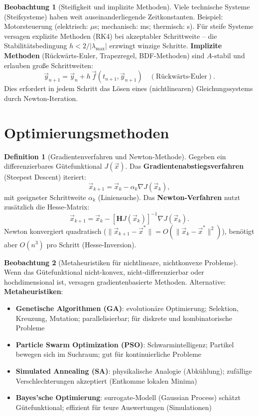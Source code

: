 ﻿\documentclass[a4paper,12pt]{report}
\theoremstyle{definition}
\newtheorem{definition}{Definition}
\newtheorem{beobachtung}{Beobachtung}
\begin{document}
\begin{beobachtung}[Steifigkeit und implizite Methoden]
Viele technische Systeme (Steifsysteme) haben weit auseinanderliegende
Zeitkonstanten. Beispiel: Motorsteuerung (elektrisch: $\mu$s; mechanisch: ms; thermisch: s).
Für steife Systeme versagen explizite Methoden (RK4) bei akzeptabler Schrittweite --
die Stabilitätsbedingung $h < 2/|\lambda_{\max}|$ erzwingt winzige Schritte.
\textbf{Implizite Methoden} (Rückwärts-Euler, Trapezregel, BDF-Methoden)
sind $A$-stabil und erlauben große Schrittweiten:
\[
  \vec{y}_{n+1} = \vec{y}_n + h\,\vec{f}(t_{n+1}, \vec{y}_{n+1}) \quad (\text{Rückwärts-Euler}).
\]
Dies erfordert in jedem Schritt das Lösen eines (nichtlinearen) Gleichungssystems
durch Newton-Iteration.
\end{beobachtung}

\section{Optimierungsmethoden}

\begin{definition}[Gradientenverfahren und Newton-Methode]
Gegeben ein differenzierbares Gütefunktional $J(\vec{x})$.
Das \textbf{Gradientenabstiegsverfahren} (Steepest Descent) iteriert:
\[
  \vec{x}_{k+1} = \vec{x}_k - \alpha_k \nabla J(\vec{x}_k),
\]
mit geeigneter Schrittweite $\alpha_k$ (Liniensuche).
Das \textbf{Newton-Verfahren} nutzt zusätzlich die Hesse-Matrix:
\[
  \vec{x}_{k+1} = \vec{x}_k - [\mathbf{H}J(\vec{x}_k)]^{-1}\nabla J(\vec{x}_k).
\]
Newton konvergiert quadratisch ($\|\vec{x}_{k+1}-\vec{x}^*\| = O(\|\vec{x}_k-\vec{x}^*\|^2)$),
benötigt aber $O(n^3)$ pro Schritt (Hesse-Inversion).
\end{definition}

\begin{beobachtung}[Metaheuristiken für nichtlineare, nichtkonvexe Probleme]
Wenn das Gütefunktional nicht-konvex, nicht-differenzierbar oder
hochdimensional ist, versagen gradientenbasierte Methoden.
Alternative: \textbf{Metaheuristiken}:
\begin{itemize}
    \item[-] \textbf{Genetische Algorithmen (GA)}: evolutionäre Optimierung;
          Selektion, Kreuzung, Mutation; parallelisierbar; für diskrete und kombinatorische Probleme
    \item[-] \textbf{Particle Swarm Optimization (PSO)}: Schwarmintelligenz;
          Partikel bewegen sich im Suchraum; gut für kontinuierliche Probleme
    \item[-] \textbf{Simulated Annealing (SA)}: physikalische Analogie (Abkühlung);
          zufällige Verschlechterungen akzeptiert (Entkomme lokalen Minima)
    \item[-] \textbf{Bayes'sche Optimierung}: surrogate-Modell (Gaussian Process)
          schätzt Gütefunktional; effizient für teure Auswertungen (Simulationen)
\end{itemize}
\end{beobachtung}
\end{document}
